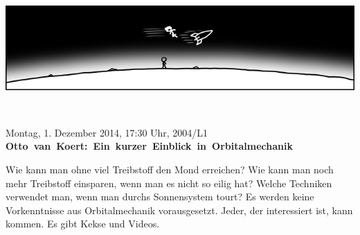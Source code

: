 \documentclass[a4paper,ngerman,landscape]{scrartcl}
\begin{document}
\begin{center}
  \Huge
  \vspace*{0.0em}
  \includegraphics[scale=1.00]{orbit-wide}
  \vspace{0.5em}

  \\[0.4em]
  \vspace{1em}

  Montag, 1. Dezember 2014, 17:30 Uhr, 2004/L1 \\
  \mbox{\textbf{Otto van Koert: Ein kurzer Einblick in Orbitalmechanik}}

  \Large
  \begin{minipage}{0.80\textwidth}
    \setlength\parskip{\medskipamount}
    \vspace{0.3em}
    Wie kann man ohne viel Treibstoff den Mond erreichen? Wie kann man noch
    mehr Treibstoff einsparen, wenn man es nicht so eilig hat? Welche Techniken
    verwendet man, wenn man durchs Sonnensystem tourt?
    Es werden keine Vorkenntnisse aus Orbitalmechanik vorausgesetzt. Jeder, der
    interessiert ist, kann kommen. Es gibt Kekse und Videos.
  \end{minipage}
\end{center}
\end{document}
